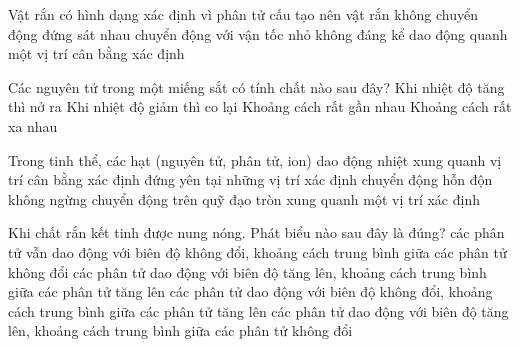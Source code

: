 \begin{ex}%
	Vật rắn có hình dạng xác định vì phân tử cấu tạo nên vật rắn
	\choice
	{không chuyển động}
	{đứng sát nhau}
	{chuyển động với vận tốc nhỏ không đáng kể}
	{\True dao động quanh một vị trí cân bằng xác định}
	\end{ex}
\begin{ex}%
	Các nguyên tử trong một miếng sắt có tính chất nào sau đây?
	\choice
	{Khi nhiệt độ tăng thì nở ra}
	{Khi nhiệt độ giảm thì co lại}
	{\True Khoảng cách rất gần nhau}
	{Khoảng cách rất xa nhau}
	\end{ex}

\begin{ex}%
	Trong tinh thể, các hạt (nguyên tử, phân tử, ion)
	\choice
	{\True dao động nhiệt xung quanh vị trí cân bằng xác định}
	{đứng yên tại những vị trí xác định}
	{chuyển động hỗn độn không ngừng}
	{chuyển động trên quỹ đạo tròn xung quanh một vị trí xác định}
\end{ex}

\begin{ex}%
	Khi chất rắn kết tinh được nung nóng. Phát biểu nào sau đây là đúng?
	\choice
	{các phân tử vẫn dao động với biên độ không đổi, khoảng cách trung bình giữa các phân tử không đổi}
	{\True các phân tử dao động với biên độ tăng lên, khoảng cách trung bình giữa các phân tử tăng lên}
	{các phân tử dao động với biên độ không đổi, khoảng cách trung bình giữa các phân tử tăng lên}
	{các phân tử dao động với biên độ tăng lên, khoảng cách trung bình giữa các phân tử không đổi}
\end{ex}

